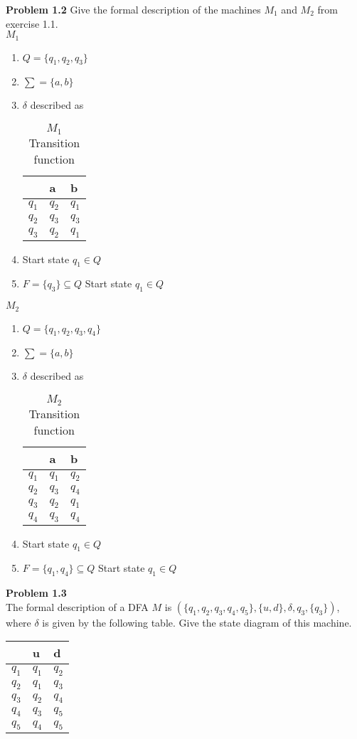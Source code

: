 \documentclass{article}
\begin{document}
{\vspace{1cm}
\large{\textbf{Problem 1.2} 
Give the formal description of the machines $M_1$ and $M_2$ from exercise 1.1.
\\
\textbf{$M_1$}
\begin{enumerate}[1., leftmargin = 0.5cm]
\itemsep0em
\item $Q = \{q_1,q_2,q_3\}$
\item $\sum = \{a,b\}$
\item $\delta$ described as
\begin{table}[h!]
\centering
\caption{$M_1$ Transition function}
\label{my-label}
\begin{tabular}{l|ll}
      & a     &    b  \\ \hline
$q_1$ & $q_2$ & $q_1$ \\
$q_2$ & $q_3$ & $q_3$ \\
$q_3$ & $q_2$ & $q_1$
\end{tabular}
\end{table}
\item Start state $q_1 \in Q$
\item $F = \{q_3\} \subseteq Q$ Start state $q_1 \in Q$
\end{enumerate}
\pagebreak
$M_2$
\begin{enumerate}[1., leftmargin = 0.5cm]
\itemsep0em
\item $Q = \{q_1,q_2,q_3,q_4\}$
\item $\sum = \{a,b\}$
\item $\delta$ described as
\begin{table}[h!]
\centering
\caption{$M_2$ Transition function}
\label{my-label}
\begin{tabular}{l|ll}
      & a     &    b  \\ \hline
$q_1$ & $q_1$ & $q_2$ \\
$q_2$ & $q_3$ & $q_4$ \\
$q_3$ & $q_2$ & $q_1$ \\
$q_4$ & $q_3$ & $q_4$
\end{tabular}
\end{table}
\item Start state $q_1 \in Q$
\item $F = \{q_1,q_4\} \subseteq Q$ Start state $q_1 \in Q$
\end{enumerate}


\vspace{1cm}
\large{\textbf{Problem 1.3} \\
The formal description of a DFA $M$ is $(\{q_1,q_2,q_3,q_4,q_5\},\{u,d\},\delta,q_3,\{q_3\})$,
where $\delta$ is given by the following table. Give the state diagram of this machine.
\begin{table}[h!]
\centering
\label{my-label}
\begin{tabular}{l|ll}
      & u     &    d  \\ \hline
$q_1$ & $q_1$ & $q_2$ \\
$q_2$ & $q_1$ & $q_3$ \\
$q_3$ & $q_2$ & $q_4$ \\
$q_4$ & $q_3$ & $q_5$ \\
$q_5$ & $q_4$ & $q_5$
\end{tabular}
\end{table}

}}}
\end{document}
